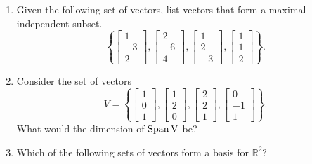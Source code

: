 \documentclass[12pt]{article}
\begin{document}
\begin{enumerate}
\bigskip

\item Given the following set of vectors, list vectors that form a maximal independent subset.
$$\left\{\left[\begin{array}{c} 
1\\-3\\2
\end{array}\right],
\left[\begin{array}{c} 
2\\-6\\4
\end{array}\right],
\left[\begin{array}{c} 
1\\2\\-3
\end{array}\right],
\left[\begin{array}{c} 
1\\1\\2
\end{array}\right] 
\right\}.$$

\bigskip

\item Consider the set of vectors 
$$V=\left\{ \left[\begin{array}{c}
1\\0\\1
\end{array}\right],\left[\begin{array}{c}
1\\2\\0
\end{array}\right],\left[\begin{array}{c}
2\\2\\1
\end{array}\right],\left[\begin{array}{c}
0\\-1\\1
\end{array}\right]\right\}.$$
What would the dimension of $\rm{Span}\,V$ be?

\bigskip
\pagebreak

\item Which of the following sets of vectors form a basis for $\mathbb{R}^2$?
\begin{center}
\end{center}
\end{enumerate}
\end{document}
